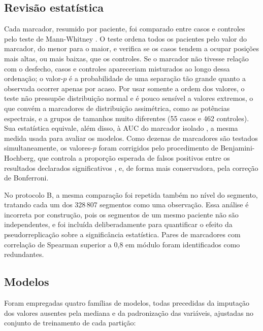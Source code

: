 \subsection{Revisão estatística}
\label{subsec:met-revisao-estatistica}

Cada marcador, resumido por paciente, foi comparado entre casos e controles
pelo teste de Mann-Whitney \cite{mann1947test}. O teste ordena todos os
pacientes pelo valor do marcador, do menor para o maior, e verifica se os
casos tendem a ocupar posições mais altas, ou mais baixas, que os controles.
Se o marcador não tivesse relação com o desfecho, casos e controles
apareceriam misturados ao longo dessa ordenação; o valor-$p$ é a
probabilidade de uma separação tão grande quanto a observada ocorrer apenas
por acaso. Por usar somente a ordem dos valores, o teste não pressupõe
distribuição normal e é pouco sensível a valores extremos, o que convém a
marcadores de distribuição assimétrica, como as potências espectrais, e a
grupos de tamanhos muito diferentes (55 casos e 462 controles). Sua
estatística equivale, além disso, à \gls{AUC} do marcador isolado
\cite{hanley1982meaning}, a mesma medida usada para avaliar os modelos.
Como dezenas de marcadores são testados
simultaneamente, os valores-$p$ foram corrigidos pelo procedimento de
Benjamini-Hochberg, que controla a proporção esperada de falsos positivos
entre os resultados declarados significativos \cite{benjamini1995controlling},
e, de forma mais conservadora, pela correção de Bonferroni.

No protocolo B, a mesma comparação foi repetida também no nível do
segmento, tratando cada um dos 328\,807 segmentos como uma observação. Essa
análise é incorreta por construção, pois os segmentos de um mesmo paciente
não são independentes, e foi incluída deliberadamente para quantificar o
efeito da pseudorreplicação sobre a significância estatística. Pares de
marcadores com correlação de Spearman superior a 0,8 em módulo foram
identificados como redundantes.

\subsection{Modelos}
\label{subsec:met-modelos-tabulares}

Foram empregadas quatro famílias de modelos, todas precedidas da imputação
dos valores ausentes pela mediana e da padronização das variáveis,
ajustadas no conjunto de treinamento de cada partição:

